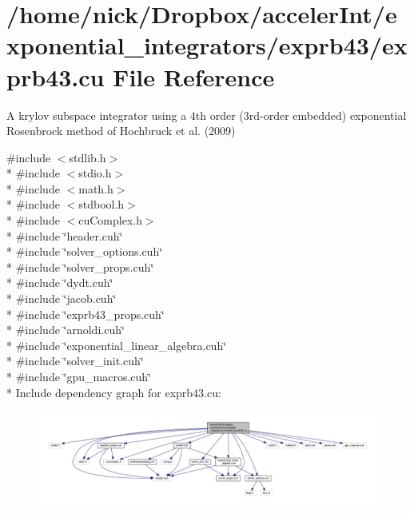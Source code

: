 \hypertarget{exprb43_8cu}{}\section{/home/nick/\+Dropbox/acceler\+Int/exponential\+\_\+integrators/exprb43/exprb43.cu File Reference}
\label{exprb43_8cu}


A krylov subspace integrator using a 4th order (3rd-\/order embedded) exponential Rosenbrock method of Hochbruck et al. (2009)  


{\ttfamily \#include $<$stdlib.\+h$>$}\\*
{\ttfamily \#include $<$stdio.\+h$>$}\\*
{\ttfamily \#include $<$math.\+h$>$}\\*
{\ttfamily \#include $<$stdbool.\+h$>$}\\*
{\ttfamily \#include $<$cu\+Complex.\+h$>$}\\*
{\ttfamily \#include \char`\"{}header.\+cuh\char`\"{}}\\*
{\ttfamily \#include \char`\"{}solver\+\_\+options.\+cuh\char`\"{}}\\*
{\ttfamily \#include \char`\"{}solver\+\_\+props.\+cuh\char`\"{}}\\*
{\ttfamily \#include \char`\"{}dydt.\+cuh\char`\"{}}\\*
{\ttfamily \#include \char`\"{}jacob.\+cuh\char`\"{}}\\*
{\ttfamily \#include \char`\"{}exprb43\+\_\+props.\+cuh\char`\"{}}\\*
{\ttfamily \#include \char`\"{}arnoldi.\+cuh\char`\"{}}\\*
{\ttfamily \#include \char`\"{}exponential\+\_\+linear\+\_\+algebra.\+cuh\char`\"{}}\\*
{\ttfamily \#include \char`\"{}solver\+\_\+init.\+cuh\char`\"{}}\\*
{\ttfamily \#include \char`\"{}gpu\+\_\+macros.\+cuh\char`\"{}}\\*
Include dependency graph for exprb43.\+cu\+:
\nopagebreak
\begin{figure}[H]
\begin{center}
\leavevmode
\includegraphics[width=350pt]{exprb43_8cu__incl}
\end{center}
\end{figure}
